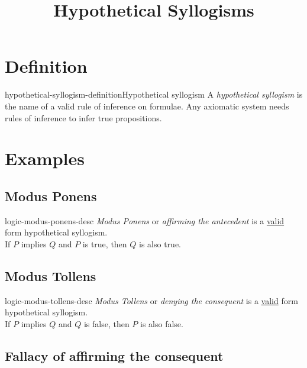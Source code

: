 \documentclass[preview]{standalone}
\begin{document}
\title{Hypothetical Syllogisms}
\genpage

\section{Definition}

\begin{snippetdefinition}{hypothetical-syllogism-definition}{Hypothetical syllogism}
    A \textit{hypothetical syllogism} is the name of a valid rule of inference on formulae.
    Any axiomatic system needs rules of inference to infer true propositions.
\end{snippetdefinition}


\section{Examples}

\subsection{Modus Ponens}

\begin{snippet}{logic-modus-ponens-desc}
\textit{Modus Ponens} or \textit{affirming the antecedent}
is a \underline{valid} form hypothetical syllogism. \\
If \(P\) implies \(Q\) and \(P\) is true, then \(Q\) is also true.
\end{snippet}


\subsection{Modus Tollens}

\begin{snippet}{logic-modus-tollens-desc}
\textit{Modus Tollens} or \textit{denying the consequent}
is a \underline{valid} form hypothetical syllogism. \\
If \(P\) implies \(Q\) and \(Q\) is false, then \(P\) is also false.
\end{snippet}


\subsection{Fallacy of affirming the consequent}
\end{document}
